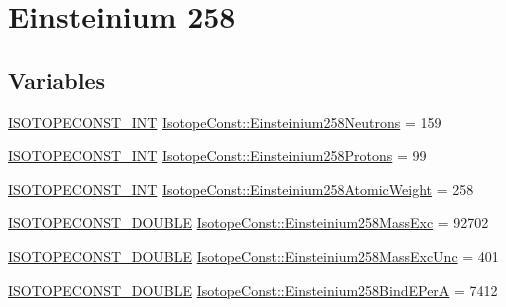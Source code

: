 \hypertarget{group___isotope_const-_einsteinium-_es258}{}\section{Einsteinium 258}
\label{group___isotope_const-_einsteinium-_es258}
\subsection*{Variables}
\begin{DoxyCompactItemize}
\item 
\mbox{\hyperlink{group___isotope_const-_macros_ga5f18360b3e99483a35c32d789e62621c}{I\+S\+O\+T\+O\+P\+E\+C\+O\+N\+S\+T\+\_\+\+I\+NT}} \mbox{\hyperlink{group___isotope_const-_einsteinium-_es258_ga9f78b927b7b43c340879b856d438de98}{Isotope\+Const\+::\+Einsteinium258\+Neutrons}} = 159
\item 
\mbox{\hyperlink{group___isotope_const-_macros_ga5f18360b3e99483a35c32d789e62621c}{I\+S\+O\+T\+O\+P\+E\+C\+O\+N\+S\+T\+\_\+\+I\+NT}} \mbox{\hyperlink{group___isotope_const-_einsteinium-_es258_gaab293879b565a9778c7bc315d3bbe5f8}{Isotope\+Const\+::\+Einsteinium258\+Protons}} = 99
\item 
\mbox{\hyperlink{group___isotope_const-_macros_ga5f18360b3e99483a35c32d789e62621c}{I\+S\+O\+T\+O\+P\+E\+C\+O\+N\+S\+T\+\_\+\+I\+NT}} \mbox{\hyperlink{group___isotope_const-_einsteinium-_es258_gaf2486c3147ea96a588677e200894a6d6}{Isotope\+Const\+::\+Einsteinium258\+Atomic\+Weight}} = 258
\item 
\mbox{\hyperlink{group___isotope_const-_macros_ga8f45a7272ce02c0b4c65c44636ed719a}{I\+S\+O\+T\+O\+P\+E\+C\+O\+N\+S\+T\+\_\+\+D\+O\+U\+B\+LE}} \mbox{\hyperlink{group___isotope_const-_einsteinium-_es258_ga4cf81f745276b115ae8a58934eeecfeb}{Isotope\+Const\+::\+Einsteinium258\+Mass\+Exc}} = 92702
\item 
\mbox{\hyperlink{group___isotope_const-_macros_ga8f45a7272ce02c0b4c65c44636ed719a}{I\+S\+O\+T\+O\+P\+E\+C\+O\+N\+S\+T\+\_\+\+D\+O\+U\+B\+LE}} \mbox{\hyperlink{group___isotope_const-_einsteinium-_es258_ga085658b06aa961600dc2e0fd5b70e239}{Isotope\+Const\+::\+Einsteinium258\+Mass\+Exc\+Unc}} = 401
\item 
\mbox{\hyperlink{group___isotope_const-_macros_ga8f45a7272ce02c0b4c65c44636ed719a}{I\+S\+O\+T\+O\+P\+E\+C\+O\+N\+S\+T\+\_\+\+D\+O\+U\+B\+LE}} \mbox{\hyperlink{group___isotope_const-_einsteinium-_es258_ga3540b99331d3486c20167bfb98e085ab}{Isotope\+Const\+::\+Einsteinium258\+Bind\+E\+PerA}} = 7412
\item 

\end{DoxyCompactItemize}
